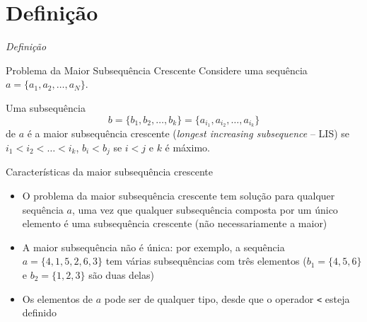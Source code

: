 \section{Definição}

\begin{frame}[fragile]{{\it Definição}}

    \begin{block}{Problema da Maior Subsequência Crescente}
        Considere uma sequência $a = \{ a_1, a_2, \ldots, a_N \}$.

        Uma subsequência 
        \[
            b = \{ b_1, b_2, \ldots, b_k \} = \{ a_{i_1}, a_{i_2}, \ldots, a_{i_k} \}
        \]
        de $a$ é a maior subsequência crescente (\textit{longest increasing subsequence} --
        LIS) se $i_1 < i_2 < \ldots < i_k$, $b_i < b_j$ se $i < j$ e $k$ é máximo.
    \end{block}

\end{frame}

\begin{frame}[fragile]{Características da maior subsequência crescente}

    \begin{itemize}
        \item O problema da maior subsequência crescente tem solução para qualquer 
            sequência $a$, uma vez que qualquer subsequência composta por um único elemento
            é uma subsequência crescente (não necessariamente a maior)

        \item A maior subsequência não é única: por exemplo, a sequência $a = \{ 4, 1, 5, 2,
            6, 3 \}$ tem várias subsequências com três elementos ($b_1 = \{ 4, 5 ,6 \}$ e 
            $b_2 = \{ 1, 2, 3 \}$ são duas delas)

        \item Os elementos de $a$ pode ser de qualquer tipo, desde que o operador 
            \texttt{<} esteja definido
    \end{itemize}

\end{frame}
